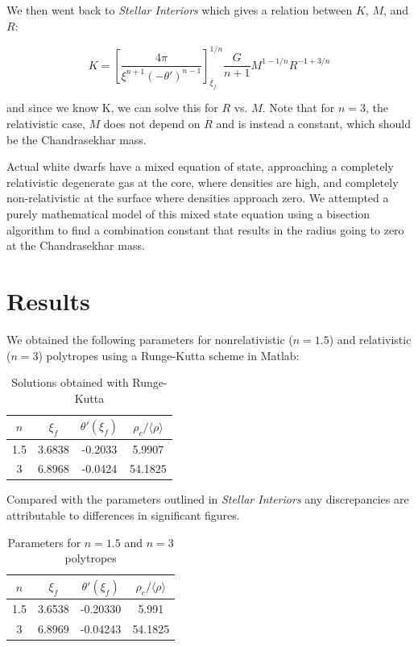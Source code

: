 \documentclass[twoside]{article}
\begin{document}
\begin{multicols}{2}
We then went back to \emph{Stellar Interiors}\cite[p.336]{hansen2004} which
gives a relation between \(K\), \(M\), and \(R\):

\begin{equation}
    \label{eq:kmr}
    K = \left[\frac{4\pi}{\xi^{n+1}(-\theta')^{n-1}}\right]_{\xi_f}^{1/n}
    \frac{G}{n+1}M^{1-1/n}R^{-1+3/n}
\end{equation}

and since we know K, we can solve this for \(R\) vs. \(M\). Note that for
\(n=3\), the relativistic case, \(M\) does not depend on \(R\) and is instead a
constant, which should be the Chandrasekhar mass.

Actual white dwarfs have a mixed equation of state, approaching a completely
relativistic degenerate gas at the core, where densities are high, and
completely non-relativistic at the surface where densities approach zero. We
attempted a purely mathematical model of this mixed state equation using a
bisection algorithm to find a combination constant that results in the radius
going to zero at the Chandrasekhar mass.


\section{Results}

We obtained the following parameters for nonrelativistic (\(n=1.5\)) and
relativistic (\(n=3\)) polytropes using a Runge-Kutta scheme in Matlab:

\begin{table}[H]
\caption{Solutions obtained with Runge-Kutta}
\centering
\begin{tabular}{c | c c c}
\toprule
\(n\) & \(\xi_f\) & \(\theta'(\xi_f)\) & \(\rho_c/\langle \rho \rangle\) \\
\midrule
1.5 & 3.6838 & -0.2033 & 5.9907 \\
3 & 6.8968 & -0.0424 & 54.1825 \\
\bottomrule
\end{tabular}
\end{table}


Compared with the parameters outlined in \textit{Stellar
Interiors}\cite{hansen2004} any discrepancies are attributable to differences in
significant figures.

\begin{table}[H]
\caption{Parameters for \(n=1.5\) and \(n=3\) polytropes\cite[p.340]{hansen2004}}
\centering
\begin{tabular}{c | c c c}
\toprule
\(n\) & \(\xi_f\) & \(\theta'(\xi_f)\) & \(\rho_c/\langle \rho \rangle\) \\
\midrule
1.5 & 3.6538 & -0.20330 & 5.991 \\
3 & 6.8969 & -0.04243 & 54.1825 \\
\bottomrule
\end{tabular}
\end{table}


\end{multicols}
\end{document}
